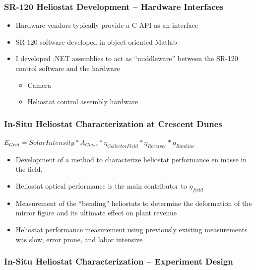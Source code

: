 \documentclass[aspectratio=169]{beamer}
\begin{document}
\begin{frame}
  \frametitle{SR-120 Heliostat Development -- Hardware Interfaces}
    \begin{itemize}
    \item Hardware vendors typically provide a C API as an interface
    \item SR-120 software developed in object oriented Matlab
    \item I developed .NET assemblies to act as ``middleware'' between the SR-120 control software and the hardware
      \begin{itemize}
        \item Camera
        \item Heliostat control assembly hardware
      \end{itemize}
  \end{itemize}
\end{frame}

\begin{frame}
  \frametitle{In-Situ Heliostat Characterization at Crescent Dunes}
      $E_{Grid}= SolarIntensity * A_{Glass} * \eta_{CollectorField} * \eta_{Receiver} * \eta_{Rankine}$
  \begin{itemize}
  \item Development of a method to characterize heliostat performance en masse in the field.
  \item Heliostat optical performance is the main contributor to $\eta_{field}$
  \item Measurement of the ``bending'' heliostats to determine the deformation of the mirror figure and its ultimate effect on plant revenue
  \item Heliostat performance measurement using previously existing measurements was slow, error prone, and labor intensive
  \end{itemize}
\end{frame}

\begin{frame}
  \frametitle{In-Situ Heliostat Characterization -- Experiment Design}

\end{frame}
\end{document}

